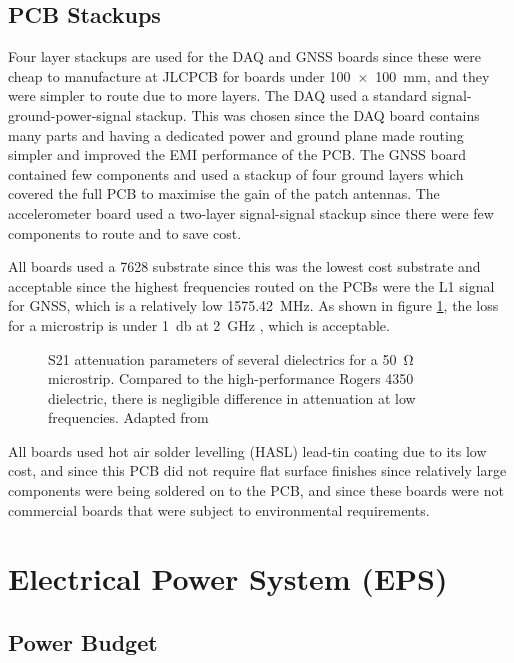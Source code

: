 \documentclass{report}
\begin{document}
\subsection{PCB Stackups}
Four layer stackups are used for the DAQ and GNSS boards since these were cheap to manufacture at JLCPCB for boards under \SI{100x100}{\milli\meter}, and they were simpler to route due to more layers. The DAQ used a standard signal-ground-power-signal stackup. This was chosen since the DAQ board contains many parts and having a dedicated power and ground plane made routing simpler and improved the EMI performance of the PCB. The GNSS board contained few components and used a stackup of four ground layers which covered the full PCB to maximise the gain of the patch antennas. The accelerometer board used a two-layer signal-signal stackup since there were few components to route and to save cost.

All boards used a 7628 substrate since this was the lowest cost substrate and acceptable since the highest frequencies routed on the PCBs were the L1 signal for GNSS, which is a relatively low \SI{1575.42}{\mega\hertz}. As shown in figure \ref{fig:7628-fr4-loss}, the loss for a microstrip is under \SI{1}{\decibel} at \SI{2}{\giga\hertz} \cite{hamilton2007humidity}, which is acceptable.

\begin{figure}[H]
  \centering
  
  \caption{S21 attenuation parameters of several dielectrics for a \SI{50}{\ohm} microstrip. Compared to the high-performance Rogers 4350 dielectric, there is negligible difference in attenuation at low frequencies. Adapted from \cite{hamilton2007humidity}}
  \label{fig:7628-fr4-loss}
\end{figure}

All boards used hot air solder levelling (HASL) lead-tin coating due to its low cost, and since this PCB did not require flat surface finishes since relatively large components were being soldered on to the PCB, and since these boards were not commercial boards that were subject to environmental requirements.

\section{Electrical Power System (EPS)}

\subsection{Power Budget}
\end{document}

